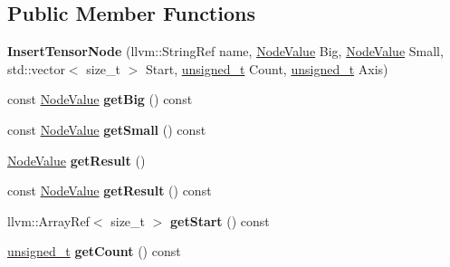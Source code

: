 \subsection*{Public Member Functions}
\begin{DoxyCompactItemize}
\item 
\mbox{\label{classglow_1_1_insert_tensor_node_a97e7060373c90e0c61076bb80907ecac}} 
{\bfseries Insert\+Tensor\+Node} (llvm\+::\+String\+Ref name, \hyperlink{structglow_1_1_node_value}{Node\+Value} Big, \hyperlink{structglow_1_1_node_value}{Node\+Value} Small, std\+::vector$<$ size\+\_\+t $>$ Start, \hyperlink{namespaceglow_a0ca574644e1e42ef193a9947fb4d8911}{unsigned\+\_\+t} Count, \hyperlink{namespaceglow_a0ca574644e1e42ef193a9947fb4d8911}{unsigned\+\_\+t} Axis)
\item 
\mbox{\label{classglow_1_1_insert_tensor_node_a869f9fcfd51a9621e3bf342953abf25d}} 
const \hyperlink{structglow_1_1_node_value}{Node\+Value} {\bfseries get\+Big} () const
\item 
\mbox{\label{classglow_1_1_insert_tensor_node_a2a462b54fce9dd45cef80a8577696bea}} 
const \hyperlink{structglow_1_1_node_value}{Node\+Value} {\bfseries get\+Small} () const
\item 
\mbox{\label{classglow_1_1_insert_tensor_node_a8c01a128ab09e83cdc7e6b0d56c85c8e}} 
\hyperlink{structglow_1_1_node_value}{Node\+Value} {\bfseries get\+Result} ()
\item 
\mbox{\label{classglow_1_1_insert_tensor_node_aacc2348bf9c627ae4bba6d0744ca7e91}} 
const \hyperlink{structglow_1_1_node_value}{Node\+Value} {\bfseries get\+Result} () const
\item 
\mbox{\label{classglow_1_1_insert_tensor_node_a33fe9cc0ef4a565218634bac0bb66951}} 
llvm\+::\+Array\+Ref$<$ size\+\_\+t $>$ {\bfseries get\+Start} () const
\item 
\mbox{\label{classglow_1_1_insert_tensor_node_ac3b62e48b3057217e6e83cd3a6d52fb5}} 
\hyperlink{namespaceglow_a0ca574644e1e42ef193a9947fb4d8911}{unsigned\+\_\+t} {\bfseries get\+Count} () const

\end{DoxyCompactItemize}
